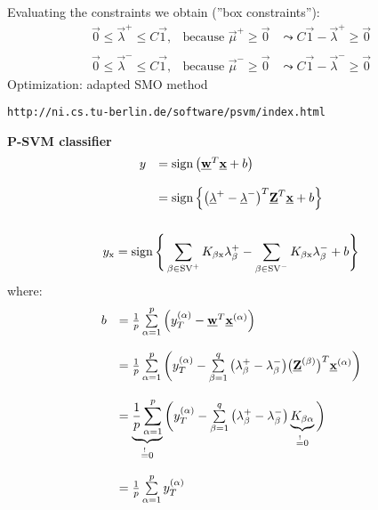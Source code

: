 Evaluating the constraints we obtain (''box constraints''):
\begin{equation}
	\begin{array}{lll}
	\vec{0} \leq \vec{\lambda}^+ \leq C \vec{1},
	& \text{because } \vec{\mu}^+ \geq \vec{0} 
	& \leadsto C \vec{1} - \vec{\lambda}^+ \geq \vec{0} 
	\\\\
	\vec{0} \leq \vec{\lambda}^- \leq C \vec{1},
	& \text{because } \vec{\mu}^- \geq \vec{0} 
	& \leadsto C \vec{1} - \vec{\lambda}^- \geq \vec{0}
	\end{array}
\end{equation}
Optimization: adapted SMO method
\begin{center}
\verb|http://ni.cs.tu-berlin.de/software/psvm/index.html|
\end{center}
{\bf P-SVM classifier}
\begin{equation} 
	\begin{array}{ll}
	y & = \operatorname{sign} \big( \underline{\mathbf{w}}^T \underline{\mathbf{x}} + b \big) \\\\
	& = \operatorname{sign} \Big\{ \big( \underline{\mathbf{\lambda}}^+ - \underline{\mathbf{\lambda}}^- \big)^T
		\underline{\mathbf{Z}}^T \underline{\mathbf{x}} + b \Big\} \\\\
	\end{array} 
\end{equation}
\begin{equation}
	y_{\mathrm{x}} = \operatorname{sign} \Bigg\{ \sum\limits_{\beta \in \mathrm{SV}^+}
		K_{\beta \mathrm{x}} \lambda_\beta^+ - 
		\sum\limits_{\beta \in \mathrm{SV}^-} 
		K_{\beta \mathrm{x}} \lambda_\beta^-
		+ b \Bigg\}
\end{equation}
where: 
\begin{equation}
	\begin{array}{ll}
	b 
	& = \frac{1}{p} \sum\limits_{\alpha = 1}^p \Big( y_T^{(\alpha)}
		- \underline{\mathbf{w}}^T \underline{\mathbf{x}}^{(\alpha)} \Big) \\\\
	& = \frac{1}{p} \sum\limits_{\alpha = 1}^p \bigg( y_T^{(\alpha)}
		- \sum\limits_{\beta = 1}^q \big( \lambda_\beta^+
			- \lambda_\beta^- \big) \big(\underline{\mathbf{Z}}^{(\beta)}
			\big)^T \underline{\mathbf{x}}^{(\alpha)} \bigg) \\\\
	& = \underbrace{ \frac{1}{p} \sum\limits_{\alpha = 1}^p }_{
				\stackrel{\mathrm{!}}{=} 0 }
		\bigg( y_T^{(\alpha)} - \sum\limits_{\beta = 1}^q 
			\big( \lambda_\beta^+ - \lambda_\beta^- \big)
			\underbrace{ K_{\beta \alpha} }_{
				\stackrel{\mathrm{!}}{=} 0 }
			\bigg) \\\\
	& = \frac{1}{p} \sum\limits_{\alpha = 1}^p y_T^{(\alpha)}
	\end{array}
\end{equation}


